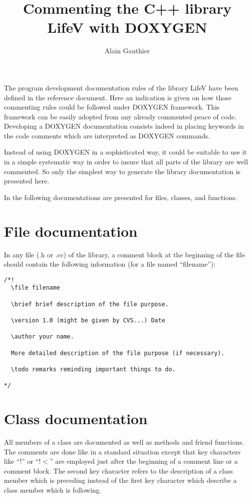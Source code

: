 \documentclass[a4paper,10pt]{article}
\title{Commenting the C++ library LifeV with DOXYGEN}
\author{Alain Gauthier}
\newcounter{rem}
\begin{document}
\maketitle

The program development documentation rules of the library LifeV have been
defined in the reference document. Here an indication is given on how
those commenting rules could be followed under DOXYGEN framework. This
framework can be easily adopted from any already commented peace of code.
Developing a DOXYGEN documentation consists indeed in placing keywords
in the code comments which are interpreted as DOXYGEN commands.

Instead of using DOXYGEN in a sophisticated way, it could be suitable
to use it in a simple systematic way in order to insure that all parts
of the library are well commented. So only the simplest way to generate
the library documentation is presented here.

In the following documentations are presented for files, classes, and
functions.

\section{File documentation}

In any file (.h or .cc) of the library, a comment block at the beginning
of the file should contain the following information (for a file named
``filename''):

\begin{verbatim}
/*!
  \file filename

  \brief brief description of the file purpose.

  \version 1.0 (might be given by CVS...) Date

  \author your name.

  More detailed description of the file purpose (if necessary).

  \todo remarks reminding important things to do.

*/
\end{verbatim}

\section{Class documentation}

All members of a class are documented as well as methods and friend
functions. The comments are done like in a standard situation except that
key characters like ``!'' or ``!$<$'' are employed just after the beginning
of a comment line or a comment block. The second key character refers to
the description of a class member which is preceding instead of the first key
character which describe a class member which is following.
\end{document}
